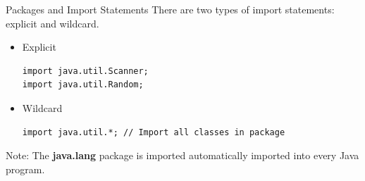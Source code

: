 \documentclass[11pt]{beamer}
\begin{document}
\begin{frame}[fragile]{Packages and Import Statements}
    There are two types of import statements: explicit and wildcard.
    \begin{itemize}
        \item Explicit
        \begin{lstlisting}
import java.util.Scanner;
import java.util.Random;            
        \end{lstlisting}
        \item Wildcard
        \begin{lstlisting}
import java.util.*; // Import all classes in package            
        \end{lstlisting}
    \end{itemize}
Note: The \textbf{java.lang} package is imported automatically imported into every Java program.
\end{frame}
\end{document}
